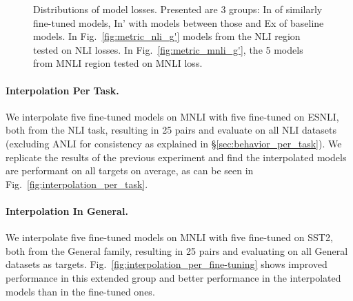 \documentclass[nohyperref]{article}
\theoremstyle{plain}
\theoremstyle{definition}
\theoremstyle{remark}
\begin{document}
\begin{figure*}[t]
\centering

\hfill
{}
\hfill
{}
    
\caption{Distributions of model losses. Presented are 3 groups: In of similarly fine-tuned models, In' with models between those and Ex of baseline models. In Fig.~\ref{fig:metric_nli_g'} models from the NLI region tested on NLI losses. In Fig.~\ref{fig:metric_mnli_g'}, the 5 models from MNLI region tested on MNLI loss.} 
\label{fig:distributions}
\end{figure*}

\paragraph{Interpolation Per Task.} We interpolate five fine-tuned models on MNLI with five fine-tuned on ESNLI, both from the NLI task, resulting in 25 pairs and evaluate on all NLI datasets (excluding ANLI for consistency as explained in \S\ref{sec:behavior_per_task}). 
We replicate the results of the previous experiment and find the interpolated models are performant on all targets on average, as can be seen in Fig.~\ref{fig:interpolation_per_task}.


\paragraph{Interpolation In General.} We interpolate five fine-tuned models on MNLI with five fine-tuned on SST2, both from the General family, resulting in 25 pairs and evaluating on all General datasets as targets. Fig.~\ref{fig:interpolation_per_fine-tuning} shows improved performance in this extended group and better performance in the interpolated models than in the fine-tuned ones. 
\end{document}
